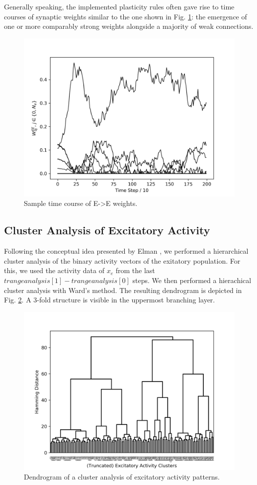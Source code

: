\documentclass[10pt,a4paper]{article}
\begin{document}
Generally speaking, the implemented plasticity rules often gave rise to time courses of synaptic weights similar to the one shown in Fig. \ref{fig:w_ee_sample_time}: the emergence of one or more comparably strong weights alongside a majority of weak connections.

\begin{figure}
\includegraphics[width=\textwidth]{../plots/w_ee_sample_time.png}
\caption{\label{fig:w_ee_sample_time} Sample time course of E->E weights.}
\end{figure}

\subsection{Cluster Analysis of Excitatory Activity}

Following the conceptual idea presented by Elman \cite{Elman_1990}, we performed a hierarchical cluster analysis of the binary activity vectors of the exitatory population. For this, we used the activity data of $x_e$ from the last $t range analysis[1]-t range analysis[0]$  steps. We then performed a hierachical cluster analysis with Ward's method. The resulting dendrogram is depicted in Fig. \ref{fig:act_dendrogram}. A 3-fold structure is visible in the uppermost branching layer.

\begin{figure}
\includegraphics[width=\textwidth]{../plots/act_dendrogram.png}
\caption{\label{fig:act_dendrogram} Dendrogram of a cluster analysis of excitatory activity patterns.}
\end{figure}



\end{document}
